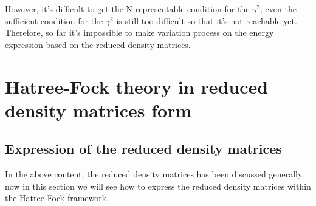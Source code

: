 However, it's difficult to get the N-representable condition for the
$\gamma^{2}$; even the sufficient condition for the $\gamma^{2}$ is
still too difficult so that it's not reachable yet. Therefore, so
far it's impossible to make variation process on the energy
expression based on the reduced density matrices.


\section{Hatree-Fock theory in reduced density matrices form}
%
\subsection{Expression of the reduced density matrices}
%
%
In the above content, the reduced density matrices has been discussed
generally, now in this section we will see how to express the reduced
density matrices within the Hatree-Fock framework.

